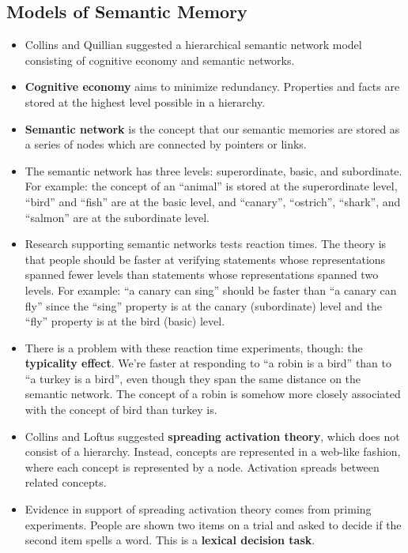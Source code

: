 \documentclass[]{article}
\begin{document}
		\subsection{Models of Semantic Memory}
			\begin{itemize}
				\item Collins and Quillian suggested a hierarchical semantic network model consisting of cognitive economy and semantic networks.
				\item \textbf{Cognitive economy} aims to minimize redundancy. Properties and facts are stored at the highest level possible in a hierarchy.
				\item \textbf{Semantic network} is the concept that our semantic memories are stored as a series of nodes which are connected by pointers or links.
				\item The semantic network has three levels: superordinate, basic, and subordinate. For example: the concept of an ``animal'' is stored at the superordinate level, ``bird'' and ``fish'' are at the basic level, and ``canary'', ``ostrich'', ``shark'', and ``salmon'' are at the subordinate level.
				\item Research supporting semantic networks tests reaction times. The theory is that people should be faster at verifying statements whose representations spanned fewer levels than statements whose representations spanned two levels. For example: ``a canary can sing'' should be faster than ``a canary can fly'' since the ``sing'' property is at the canary (subordinate) level and the ``fly'' property is at the bird (basic) level.
				\item There is a problem with these reaction time experiments, though: the \textbf{typicality effect}. We're faster at responding to ``a robin is a bird'' than to ``a turkey is a bird'', even though they span the same distance on the semantic network. The concept of a robin is somehow more closely associated with the concept of bird than turkey is.
				\item Collins and Loftus suggested \textbf{spreading activation theory}, which does not consist of a hierarchy. Instead, concepts are represented in a web-like fashion, where each concept is represented by a node. Activation spreads between related concepts.
				\item Evidence in support of spreading activation theory comes from priming experiments. People are shown two items on a trial and asked to decide if the second item spells a word. This is a \textbf{lexical decision task}.
			\end{itemize}
\end{document}
